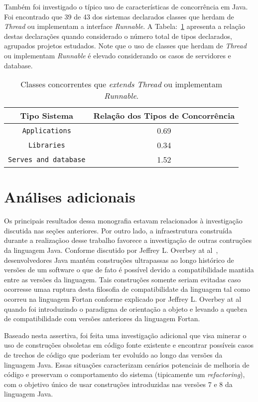 Também foi investigado o típico uso de características de concorrência em Java. Foi encontrado que 39 de 43 dos sistemas declarados classes que herdam de \textit{Thread} ou implementam a interface \textit{Runnable}. A Tabela:~\ref{tab:concorrenciaJava} apresenta a relação destas declarações quando considerado o número total de tipos declarados, agrupados projetos estudados. Note que o uso de classes que herdam de \textit{Thread} ou implementam \textit{Runnable} é elevado considerando os casos de servidores e database.

\begin{table}[h]
	\centering
	\caption{Classes concorrentes que \textit{extends Thread} ou implementam \textit{Runnable}.}
	\begin{tabular}{cc}
		\hline
		Tipo Sistema & Relação dos Tipos de Concorrência\\ 
		\hline \hline
		\texttt{Applications} & 0.69 \\ 
		\texttt{Libraries} & 0.34 \\ 
		\texttt{Serves and database} & 1.52 \\ \hline
	\end{tabular}
	\label{tab:concorrenciaJava} %
\end{table}

\section{Análises adicionais}
Os principais resultados dessa monografia estavam relacionados à investigação discutida nas seções anteriores. Por outro lado, a infraestrutura construída  durante a realizaçãoo desse trabalho favorece a investigação de outras contruções da linguagem Java. Conforme discutido por Jeffrey L. Overbey at al~\cite{Overbey:2009}, desenvolvedores Java mantém construções ultrapassas ao longo histórico de versões de um  software o que de fato é possível devido a compatibilidade mantida entre as versões da linguagem. Tais construções somente seriam evitadas caso ocorresse umaa ruptura desta filosofia de compatibilidate da linguagem tal como ocorreu na linguagem Fortan conforme explicado por Jeffrey L. Overbey at al~\cite{Overbey:2009} quando foi  introduzindo o paradigma de orientação a objeto e levando a quebra de compatibilidade com versões anteriores da linguagem Fortan.

Baseado nesta assertiva, foi feita uma investigação adicional que visa minerar o uso de construções obsoletas 
em código fonte existente e encontrar possíveis casos de trechos de código que poderiam ter evoluído ao longo das versões da linguagem Java. Essas situações caracterizam cenários potenciais de melhoria de código e preservam 
o comportamento do sistema (tipicamente um \textit{refactoring}), com o objetivo único de usar construções introduzidas nas versões 7 e 8 da linguagem Java.


